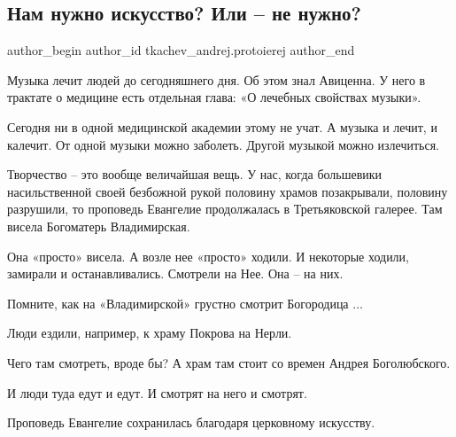  
 
 
 
 
\subsection{Нам нужно искусство? Или – не нужно?}
\label{sec:21_01_2022.yz.tkachev_andrej.protoierej.1.isskustvo}
 
\ifcmt
 author_begin
   author_id tkachev_andrej.protoierej
 author_end
\fi

Музыка лечит людей до сегодняшнего дня. Об этом знал Авиценна. У него в
трактате о медицине есть отдельная глава: «О лечебных свойствах музыки». 

Сегодня ни в одной медицинской академии этому не учат. А музыка и лечит, и
калечит. От одной музыки можно заболеть. Другой музыкой можно излечиться. 


Творчество – это вообще величайшая вещь. У нас, когда большевики насильственной
своей безбожной рукой половину храмов позакрывали, половину разрушили, то
проповедь Евангелие продолжалась в Третьяковской галерее. Там висела Богоматерь
Владимирская. 

Она «просто» висела. А возле нее «просто» ходили. И некоторые ходили, замирали
и останавливались. Смотрели на Нее. Она – на них. 

Помните, как на «Владимирской» грустно смотрит Богородица ... 

Люди ездили, например, к храму Покрова на Нерли. 

Чего там смотреть, вроде бы? А храм там стоит со времен Андрея Боголюбского. 

И люди туда едут и едут. И смотрят на него и смотрят. 

Проповедь Евангелие сохранилась благодаря церковному искусству. 


